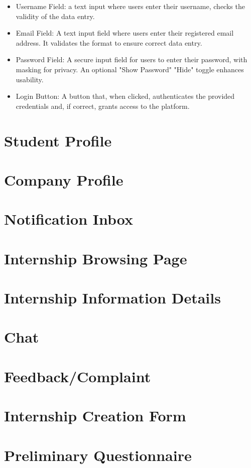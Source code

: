 \begin{itemize}
    \item Username Field: a text input where users enter their username, checks the validity of the data entry.
    \item Email Field: A text input field where users enter their registered email address. 
    It validates the format to ensure correct data entry.
    \item Password Field: A secure input field for users to enter their password, with masking for privacy. 
    An optional "Show Password" "Hide" toggle enhances usability.
    \item Login Button: A button that, when clicked, authenticates the provided credentials 
    and, if correct, grants access to the platform. 
\end{itemize}

\section{Student Profile}
\section{Company Profile}
\section{Notification Inbox}
\section{Internship Browsing Page}
\section{Internship Information Details}
\section{Chat}
\section{Feedback/Complaint}
\section{Internship Creation Form}
\section{Preliminary Questionnaire}




